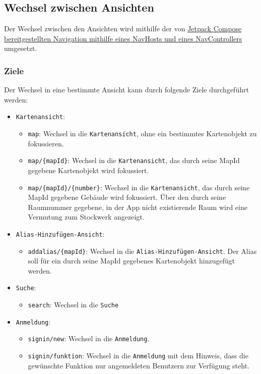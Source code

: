\subsection{Wechsel zwischen Ansichten}
Der Wechsel zwischen den Ansichten wird mithilfe der von \href{https://developer.android.com/jetpack/compose/navigation?hl=fr}
{Jetpack Compose bereitgestellten Navigation mithilfe eines NavHosts und eines NavControllers} 
umgesetzt.

\subsubsection*{Ziele}
Der Wechsel in eine bestimmte Ansicht kann durch folgende Ziele durchgeführt werden:
\begin{itemize}
    \item \texttt{Kartenansicht}: 
    \begin{itemize}
        \item \texttt{map}: Wechsel in die \texttt{Kartenansicht}, ohne ein bestimmtes Kartenobjekt zu fokussieren.
        \item \texttt{map/\{mapId\}}: Wechsel in die \texttt{Kartenansicht}, das durch seine MapId gegebene Kartenobjekt wird fokussiert.
        \item \texttt{map/\{mapId\}/\{number\}}: Wechsel in die \texttt{Kartenansicht}, das durch seine MapId gegebene Gebäude wird fokussiert. 
        Über den durch seine Raumnummer gegebene, in der App nicht existierende Raum wird eine Vermutung zum Stockwerk angezeigt.
    \end{itemize}
    \item \texttt{Alias-Hinzufügen-Ansicht}:
    \begin{itemize}
        \item \texttt{addalias/\{mapId\}}: Wechsel in die \texttt{Alias-Hinzufügen-Ansicht}. 
        Der Alias soll für ein durch seine MapId gegebenes Kartenobjekt hinzugefügt werden.
    \end{itemize}
    \item \texttt{Suche}: 
    \begin{itemize}
        \item \texttt{search}: Wechsel in die \texttt{Suche}
    \end{itemize}
    \item \texttt{Anmeldung}: \begin{itemize}
        \item \texttt{signin/new}: Wechsel in die \texttt{Anmeldung}.
        \item \texttt{signin/funktion}: Wechsel in die \texttt{Anmeldung} mit dem Hinweis, dass die gewünschte Funktion nur angemeldeten Benutzern zur Verfügung steht.

\end{itemize}
\end{itemize}
